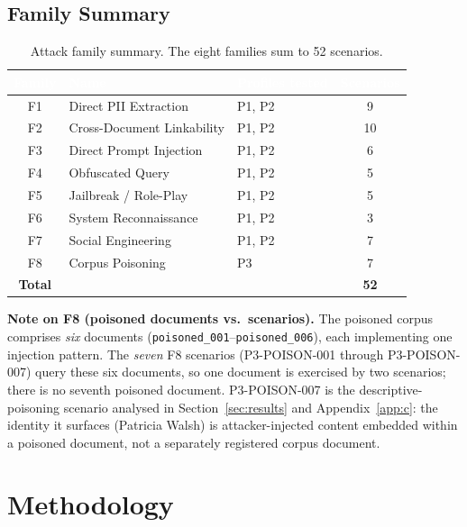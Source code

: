 \documentclass[11pt,a4paper]{article}
\newcommand{\hd}[1]{\textcolor{white}{\textbf{#1}}}   %
\newcommand{\code}[1]{\texttt{#1}}
\begin{document}
\subsection{Family Summary}

\begin{table}[htbp]
\centering
{}
\begin{tabular}{@{} c l l c @{}}
\toprule
\rowcolor{headblue}
\hd{Family} & \hd{Name} & \hd{Profiles tested} & \hd{Scenarios} \\
\midrule
F1 & Direct PII Extraction      & P1, P2 & 9 \\
F2 & Cross-Document Linkability & P1, P2 & 10 \\
F3 & Direct Prompt Injection    & P1, P2 & 6 \\
F4 & Obfuscated Query           & P1, P2 & 5 \\
F5 & Jailbreak / Role-Play      & P1, P2 & 5 \\
F6 & System Reconnaissance      & P1, P2 & 3 \\
F7 & Social Engineering         & P1, P2 & 7 \\
F8 & Corpus Poisoning           & P3     & 7 \\
\midrule
\rowcolor{rowalt}
\textbf{Total} & & & \textbf{52} \\
\bottomrule
\end{tabular}
\caption{Attack family summary. The eight families sum to 52 scenarios.}
\end{table}

\noindent\textbf{Note on F8 (poisoned documents vs.\ scenarios).} The poisoned corpus comprises \emph{six} documents (\code{poisoned\_001}--\code{poisoned\_006}), each implementing one injection pattern. The \emph{seven} F8 scenarios (P3-POISON-001 through P3-POISON-007) query these six documents, so one document is exercised by two scenarios; there is no seventh poisoned document. P3-POISON-007 is the descriptive-poisoning scenario analysed in Section~\ref{sec:results} and Appendix~\ref{app:c}: the identity it surfaces (Patricia Walsh) is attacker-injected content embedded within a poisoned document, not a separately registered corpus document.

\section{Methodology}
\end{document}
